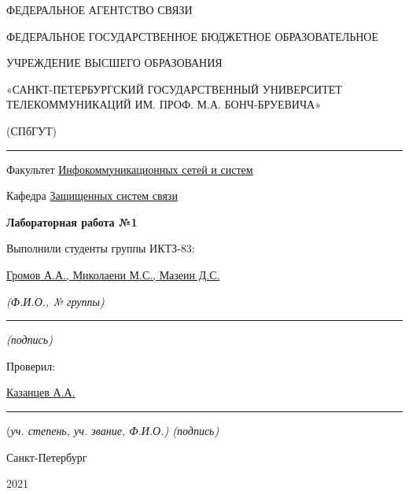 \documentclass[a4paper,14pt]{extarticle}
\begin{document}
    \begin{center}
        \thispagestyle{empty}
        \begin{singlespace}
        ФЕДЕРАЛЬНОЕ АГЕНТСТВО СВЯЗИ

        ФЕДЕРАЛЬНОЕ ГОСУДАРСТВЕННОЕ БЮДЖЕТНОЕ ОБРАЗОВАТЕЛЬНОЕ

        УЧРЕЖДЕНИЕ ВЫСШЕГО ОБРАЗОВАНИЯ

        «САНКТ-ПЕТЕРБУРГСКИЙ ГОСУДАРСТВЕННЫЙ УНИВЕРСИТЕТ ТЕЛЕКОММУНИКАЦИЙ ИМ. ПРОФ. М.А. БОНЧ-БРУЕВИЧА»

        (СПбГУТ)
        \end{singlespace}
        \vspace{-1ex}
        \rule{\textwidth}{0.4pt}
        \vspace{-5ex}

        Факультет \underline{Инфокоммуникационных сетей и систем}

        Кафедра \underline{Защищенных систем связи}
        \vspace{10ex}

        \textbf{Лабораторная работа №1}\\
        


    \end{center}
    \vspace{4ex}
    \begin{flushright}
    \parbox{10 cm}{
    \begin{flushleft}
        Выполнили студенты группы ИКТЗ-83:

        \underline{Громов А.А., Миколаени М.С., Мазеин Д.С.} \hfill 

        \footnotesize \textit{ (Ф.И.О., № группы)} \hfill \rule[-0.85ex]{0.1\textwidth}{0.6pt}
        
        \hfill \textit{(подпись)} \normalsize

        Проверил:

        \underline{Казанцев А.А.} \hfill \rule[-0.85ex]{0.1\textwidth}{0.6pt}

        (\footnotesize \textit{уч. степень, уч. звание, Ф.И.О.) \hfill (подпись)} \normalsize

    \end{flushleft}
    }
    \end{flushright}
    \begin{center}
        \vfill
        Санкт-Петербург

        2021

    \end{center}
    \newpage
\end{document}
